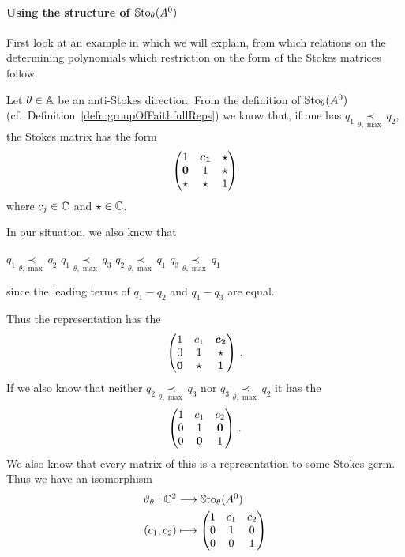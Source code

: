 \paragraph{Using the structure of $\operatorname{\mathbb{S}to}_\theta(A^0)$}
First look at an example in which we will explain, from which relations on the
determining polynomials which restriction on the form of the Stokes matrices
follow.
\begin{exmp}
  Let $\theta\in\mathbb{A}$ be an anti-Stokes direction.
  From the definition of $\operatorname{\mathbb{S}to}_\theta(A^0)$ (cf.\
  Definition~\ref{defn:groupOfFaithfullReps}) we know that, if one has $q_1
  \underset{\theta,\max}{\prec} q_2$, the Stokes matrix has the form
  \[
    \begin{pmatrix}
      1 & \text{\boldmath$c_1$} & \star
    \\\text{\boldmath$0$} & 1 & \star
    \\\star & \star & 1
    \end{pmatrix}
  \]
  where $c_j\in\mathbb{C}$ and $\star\in\mathbb{C}$.
  \begin{s-rem}
    In our situation, we also know that
    \begin{einr}
      $q_1 \underset{\theta,\max}{\prec} q_2$
      \Leftrightarrow{}
      $q_1 \underset{\theta,\max}{\prec} q_3$
      \qquad {} \qquad
      $q_2 \underset{\theta,\max}{\prec} q_1$
      \Leftrightarrow{}
      $q_3 \underset{\theta,\max}{\prec} q_1$
    \end{einr}
    since the leading terms of $q_1-q_2$ and $q_1-q_3$ are equal.
  \end{s-rem}
  Thus the representation has the 
  \[
    \begin{pmatrix}
      1 & c_1 & \text{\boldmath$c_2$}
    \\0 & 1 & \star
    \\\text{\boldmath$0$} & \star & 1
    \end{pmatrix}\,.
  \]
  If we also know that neither $q_2 \underset{\theta,\max}{\prec} q_3$ nor
  $q_3 \underset{\theta,\max}{\prec} q_2$ it has the \rewrite{form}
  \[
    \begin{pmatrix}
      1 & c_1 & c_2
    \\0 & 1 & \text{\boldmath$0$}
    \\0 & \text{\boldmath$0$} & 1
    \end{pmatrix}\,.
  \]
  We also know that every matrix of this  is a representation to
  some Stokes germ.
  Thus we have an isomorphism
  \begin{align*}
    \vartheta_\theta:\mathbb{C}^2 &\longrightarrow \operatorname{\mathbb{S}to}_\theta(A^0)
  \\(c_1,c_2)&\longmapsto
    \begin{pmatrix}
      1 & c_1 & c_2
    \\0 & 1 & 0
    \\0 & 0 & 1
    \end{pmatrix}
  \end{align*}
\end{exmp}
